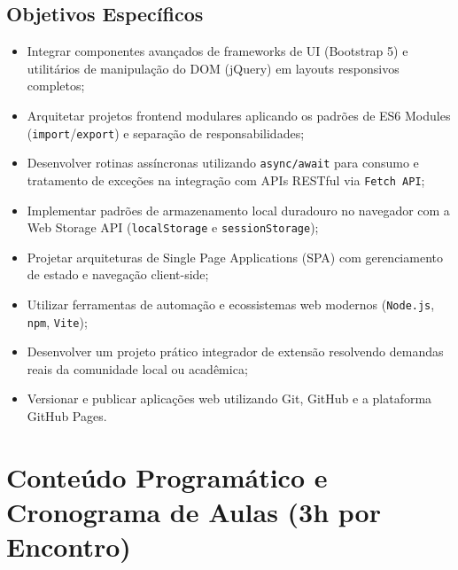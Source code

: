 \documentclass[12pt,a4paper]{article}
\begin{document}
\subsection{Objetivos Específicos}
\begin{itemize}[leftmargin=*]
    \item Integrar componentes avançados de frameworks de UI (Bootstrap 5) e utilitários de manipulação do DOM (jQuery) em layouts responsivos completos;
    \item Arquitetar projetos frontend modulares aplicando os padrões de ES6 Modules (\texttt{import}/\texttt{export}) e separação de responsabilidades;
    \item Desenvolver rotinas assíncronas utilizando \texttt{async/await} para consumo e tratamento de exceções na integração com APIs RESTful via \texttt{Fetch API};
    \item Implementar padrões de armazenamento local duradouro no navegador com a Web Storage API (\texttt{localStorage} e \texttt{sessionStorage});
    \item Projetar arquiteturas de Single Page Applications (SPA) com gerenciamento de estado e navegação client-side;
    \item Utilizar ferramentas de automação e ecossistemas web modernos (\texttt{Node.js}, \texttt{npm}, \texttt{Vite});
    \item Desenvolver um projeto prático integrador de extensão resolvendo demandas reais da comunidade local ou acadêmica;
    \item Versionar e publicar aplicações web utilizando Git, GitHub e a plataforma GitHub Pages.
\end{itemize}

\section{Conteúdo Programático e Cronograma de Aulas (3h por Encontro)}
\end{document}

